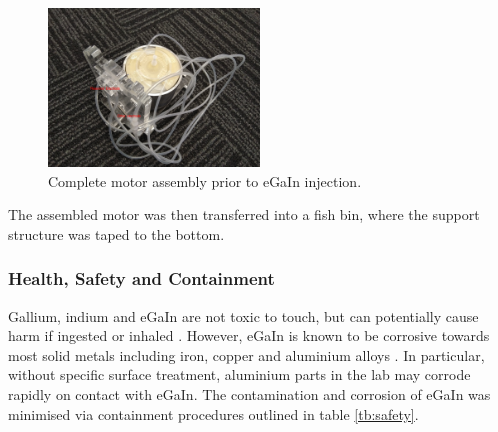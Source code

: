 \documentclass[a4paper,12pt]{article}
\begin{document}
\begin{figure}[h!]
    \centering
    \includegraphics[width=0.5\textwidth]{jignoegain.jpg}
    \caption{Complete motor assembly prior to eGaIn injection.}
    \label{fg:jignoegain}
\end{figure}

The assembled motor was then transferred into a fish bin, where the support structure was taped to the bottom.

\subsubsection{Health, Safety and Containment}

Gallium, indium and eGaIn are not toxic to touch, but can potentially cause harm if ingested or inhaled \cite{dickeyEutecticGalliumIndiumEGaIn2008}. However, eGaIn is known to be corrosive towards most solid metals including iron, copper and aluminium alloys \cite{cuiLiquidMetalCorrosion2018}. In particular, without specific surface treatment, aluminium parts in the lab may corrode rapidly on contact with eGaIn. The contamination and corrosion of eGaIn was minimised via containment procedures outlined in table \ref{tb:safety}.
\end{document}

